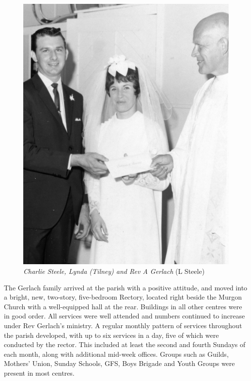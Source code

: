 \begin{figure}
\begin{center}
\includegraphics[width=1.\linewidth,center]{../images/lyndaTilneyVestry.jpg}
\caption{{\itshape Charlie Steele, Lynda (Tilney) and Rev A Gerlach} {\scriptsize(L Steele)}}
\end{center}
\end{figure}




The Gerlach family arrived at the parish with a positive attitude, and moved into a bright, new, two-story, five-bedroom Rectory, located right beside the Murgon Church with a well-equipped hall at the rear. Buildings in all other centres were in good order. All services were well attended and numbers continued to increase under Rev Gerlach's ministry. A regular monthly pattern of services throughout the parish developed, with up to six services in a day, five of which were conducted by the rector. This included at least the second and fourth Sundays of each month, along with additional mid-week offices. Groups such as Guilds, Mothers' Union, Sunday Schools, GFS, Boys Brigade and Youth Groups were present in most centres.



